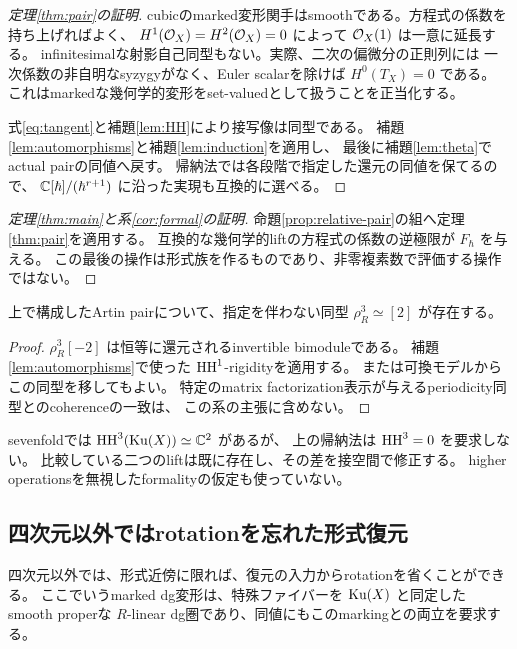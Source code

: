 \begin{proof}[定理\ref{thm:pair}の証明]
 cubicのmarked変形関手はsmoothである。方程式の係数を持ち上げればよく、
 \(H^1(\mathcal O_X)=H^2(\mathcal O_X)=0\) によって \(\mathcal O_X(1)\) は一意に延長する。
 infinitesimalな射影自己同型もない。実際、二次の偏微分の正則列には
 一次係数の非自明なsyzygyがなく、Euler scalarを除けば \(H^0(T_X)=0\) である。
 これはmarkedな幾何学的変形をset-valuedとして扱うことを正当化する。

 式\eqref{eq:tangent}と補題\ref{lem:HH}により接写像は同型である。
 補題\ref{lem:automorphisms}と補題\ref{lem:induction}を適用し、
 最後に補題\ref{lem:theta}でactual pairの同値へ戻す。
 帰納法では各段階で指定した還元の同値を保てるので、
 \(\mathbb C[\hbar]/(\hbar^{r+1})\) に沿った実現も互換的に選べる。
\end{proof}

\begin{proof}[定理\ref{thm:main}と系\ref{cor:formal}の証明]
 命題\ref{prop:relative-pair}の組へ定理\ref{thm:pair}を適用する。
 互換的な幾何学的liftの方程式の係数の逆極限が \(F_\hbar\) を与える。
 この最後の操作は形式族を作るものであり、非零複素数で評価する操作ではない。
\end{proof}

\begin{corollary}\label{cor:period}
 上で構成したArtin pairについて、指定を伴わない同型
 \(\rho_R^3\simeq[2]\) が存在する。
\end{corollary}
\begin{proof}
 \(\rho_R^3[-2]\) は恒等に還元されるinvertible bimoduleである。
 補題\ref{lem:automorphisms}で使った \(\operatorname{HH}^1\)-rigidityを適用する。
 または可換モデルからこの同型を移してもよい。
 特定のmatrix factorization表示が与えるperiodicity同型とのcoherenceの一致は、
 この系の主張に含めない。
\end{proof}

\begin{remark}
 sevenfoldでは \(\operatorname{HH}^3(\operatorname{Ku}(X))\simeq\mathbb C^2\) があるが、
 上の帰納法は \(\operatorname{HH}^3=0\) を要求しない。
 比較している二つのliftは既に存在し、その差を接空間で修正する。
 higher operationsを無視したformalityの仮定も使っていない。
\end{remark}

\subsection{四次元以外ではrotationを忘れた形式復元}\label{sec:unpolarized-formal}

四次元以外では、形式近傍に限れば、復元の入力からrotationを省くことができる。
ここでいうmarked dg変形は、特殊ファイバーを \(\operatorname{Ku}(X)\) と同定した
smooth properな \(R\)-linear dg圏であり、同値にもこのmarkingとの両立を要求する。

